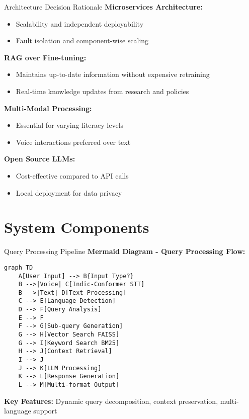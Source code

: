 \documentclass[aspectratio=169]{beamer}
\begin{document}
\begin{frame}{Architecture Decision Rationale}
\textbf{Microservices Architecture:}
\begin{itemize}
\item Scalability and independent deployability
\item Fault isolation and component-wise scaling
\end{itemize}

\textbf{RAG over Fine-tuning:}
\begin{itemize}
\item Maintains up-to-date information without expensive retraining
\item Real-time knowledge updates from research and policies
\end{itemize}

\textbf{Multi-Modal Processing:}
\begin{itemize}
\item Essential for varying literacy levels
\item Voice interactions preferred over text
\end{itemize}

\textbf{Open Source LLMs:}
\begin{itemize}
\item Cost-effective compared to API calls
\item Local deployment for data privacy
\end{itemize}
\end{frame}

\section{System Components}

\begin{frame}{Query Processing Pipeline}
\textbf{Mermaid Diagram - Query Processing Flow:}

\begin{small}
\begin{verbatim}
graph TD
    A[User Input] --> B{Input Type?}
    B -->|Voice| C[Indic-Conformer STT]
    B -->|Text| D[Text Processing]
    C --> E[Language Detection]
    D --> F[Query Analysis]
    E --> F
    F --> G[Sub-query Generation]
    G --> H[Vector Search FAISS]
    G --> I[Keyword Search BM25]
    H --> J[Context Retrieval]
    I --> J
    J --> K[LLM Processing]
    K --> L[Response Generation]
    L --> M[Multi-format Output]
\end{verbatim}
\end{small}

\textbf{Key Features:} Dynamic query decomposition, context preservation, multi-language support
\end{frame}
\end{document}
